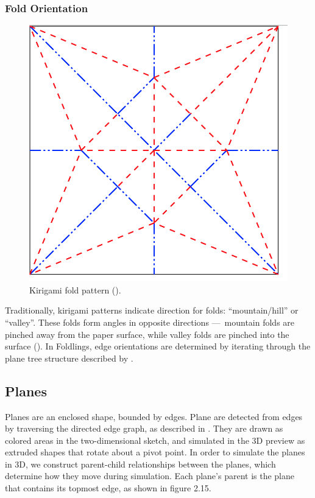\subsubsection{Fold Orientation}\label{fold-orientation}

\begin{figure}[htbp]
\centering
\includegraphics{figures/33_UI_Interface_Data_Structures/maekawas-theorem.png}
\caption{Kirigami fold pattern (\citet{maekawas-theorem}).}
\end{figure}

Traditionally, kirigami patterns indicate direction for folds:
``mountain/hill'' or ``valley''. These folds form angles in opposite
directions ---~mountain folds are pinched away from the paper surface,
while valley folds are pinched into the surface
(\citet{chatani_pop-up_1986}). In Foldlings, edge orientations are
determined by iterating through the plane tree structure described by
\citet{mallen}.

\subsection{Planes}\label{planes}

Planes are an enclosed shape, bounded by edges. Plane are detected from
edges by traversing the directed edge graph, as described in
\citet{mallen}. They are drawn as colored areas in the two-dimensional
sketch, and simulated in the 3D preview as extruded shapes that rotate
about a pivot point. In order to simulate the planes in 3D, we construct
parent-child relationships between the planes, which determine how they
move during simulation. Each plane's parent is the plane that contains
its topmost edge, as shown in figure 2.15.

